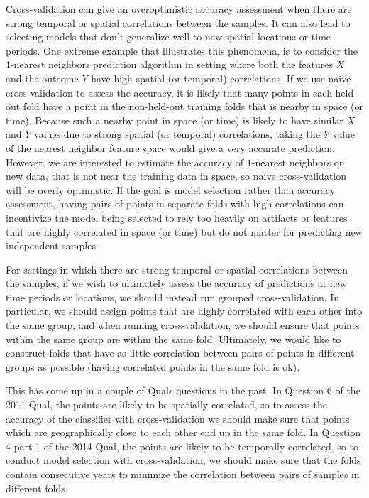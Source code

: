 Cross-validation can give an overoptimistic accuracy assessment when there are strong temporal or spatial correlations between the samples. It can also lead to selecting models that don't generalize well to new spatial locations or time periods. One extreme example that illustrates this phenomena, is to consider the $1$-nearest neighbors prediction algorithm in setting where both the features $X$ and the outcome $Y$ have high spatial (or temporal) correlations. If we use naive cross-validation to assess the accuracy, it is likely that many points in each held out fold have a point in the non-held-out training folds that is nearby in space (or time). Because such a nearby point in space (or time) is likely to have similar $X$ and $Y$ values due to strong spatial (or temporal) correlations, taking the $Y$ value of the nearest neighbor feature space would give a very accurate prediction. However, we are interested to estimate the accuracy of $1$-nearest neighbors on new data, that is not near the training data in space, so naive cross-validation will be overly optimistic. If the goal is model selection rather than accuracy assessment, having pairs of points in separate folds with high correlations can incentivize the model being selected to rely too heavily on artifacts or features that are highly correlated in space (or time) but do not matter for predicting new independent samples.

For settings in which there are strong temporal or spatial correlations between the samples, if we wish to ultimately assess the accuracy of predictions at new time periods or locations, we should instead run grouped cross-validation. In particular, we should assign points that are highly correlated with each other into the same group, and when running cross-validation, we should ensure that points within the same group are within the same fold. Ultimately, we would like to construct folds that have as little correlation between pairs of points in different groups as possible (having correlated points in the same fold is ok). 

This has come up in a couple of Quals questions in the past. In Question 6 of the 2011 Qual, the points are likely to be spatially correlated, so to assess the accuracy of the classifier with cross-validation we should make sure that points which are geographically close to each other end up in the same fold. In Question 4 part 1 of the 2014 Qual, the points are likely to be temporally correlated, so to conduct model selection with cross-validation, we should make sure that the folds contain consecutive years to minimize the correlation between pairs of samples in different folds.

